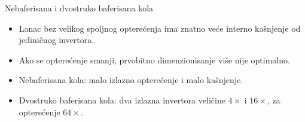 \begin{frame}[label=09_3-s023]{Nebaferisana i dvostruko baferisana kola}
\begin{itemize}
\item Lanac bez velikog spoljnog opterećenja ima znatno veće interno kašnjenje od jediničnog invertora.
\item Ako se opterećenje smanji, prvobitno dimenzionisanje više nije optimalno.
\item \alert{Nebaferisana kola:} malo izlazno opterećenje i malo kašnjenje.
\item \alert{Dvostruko baferisana kola:} dva izlazna invertora veličine $4\times$ i $16\times$, za opterećenje $64\times$.
\end{itemize}
\end{frame}
